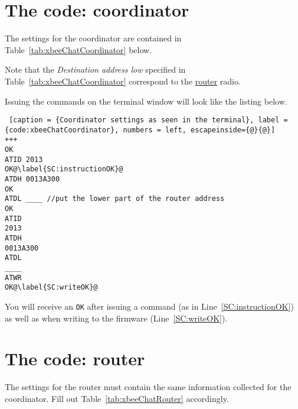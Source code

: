 \section{The code: coordinator}

The settings for the coordinator are contained in Table~\ref{tab:xbeeChatCoordinator} below.

\begin{table}[htbp]
	\centering
	\caption{XBee coordinator settings for simple chat}
	\label{tab:xbeeChatCoordinator}
\end{table}

Note that the \emph{Destination address low} specified in Table~\ref{tab:xbeeChatCoordinator} correspond to the \underline{router} radio.

Issuing the commands on the terminal window will look like the listing below.

\begin{lstlisting} [caption = {Coordinator settings as seen in the terminal}, label = {code:xbeeChatCoordinator}, numbers = left, escapeinside={@}{@}]
+++
OK
ATID 2013
OK@\label{SC:instructionOK}@
ATDH 0013A300
OK
ATDL ____ //put the lower part of the router address
OK
ATID
2013
ATDH
0013A300
ATDL
____
ATWR
OK@\label{SC:writeOK}@
\end{lstlisting}

You will receive an \texttt{OK} after issuing a command (as in Line~\ref{SC:instructionOK}) as well as when writing to the firmware (Line~\ref{SC:writeOK}).

\section{The code: router}

The settings for the router must contain the same information collected for the coordinator. Fill out Table~\ref{tab:xbeeChatRouter} accordingly.

